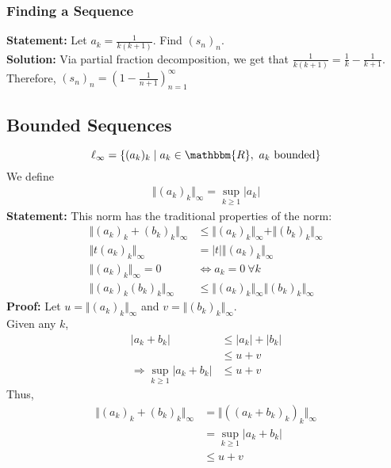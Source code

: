 \documentclass[10pt]{extarticle}
\newcommand{\R}{\mathbbm{R}}
\begin{document}
        \subsubsection{Finding a Sequence}%
        \textbf{Statement:} Let $a_k = \frac{1}{k(k+1)}$. Find $(s_n)_n$.\\

        \textbf{Solution:} Via partial fraction decomposition, we get that $\frac{1}{k(k+1)} = \frac{1}{k}-\frac{1}{k+1}$. Therefore, $(s_n)_n = \left(1-\frac{1}{n+1}\right)_{n=1}^{\infty}$
    \subsection{Bounded Sequences}%
    \[
      \ell_{\infty} = \left\{(a_k)_k \mid a_k\in\R,~a_k~\text{bounded}\right\}
    \] 
    We define
    \begin{align*}
      \Vert(a_k)_k\Vert_{\infty} = \sup_{k\geq 1}|a_k|\tag*{Infinity Norm}
    \end{align*}
    \textbf{Statement:} This norm has the traditional properties of the norm:
    \begin{align*}
      \Vert (a_k)_k + (b_k)_k\Vert_{\infty} &\leq \Vert(a_k)_k\Vert_{\infty} + \Vert(b_k)_k\Vert_{\infty}\tag*{Triangle Inequality}\\
      \Vert t(a_k)_k\Vert_{\infty} &= |t|\Vert(a_k)_k\Vert_{\infty}\tag*{Scalar Multiplication}\\
      \Vert(a_k)_k\Vert_{\infty} = 0 &\Leftrightarrow a_k = 0~\forall k\tag*{Zero Property}\\
      \Vert(a_k)_k(b_k)_k\Vert_{\infty} &\leq \Vert(a_k)_k\Vert_{\infty}\Vert(b_k)_k\Vert_{\infty}\tag*{Multiplication}
    \end{align*}
    \textbf{Proof:} Let $u = \Vert(a_k)_k\Vert_{\infty}$ and $v = \Vert(b_k)_k\Vert_{\infty}$.\\

      Given any $k$,
      \begin{align*}
        |a_k + b_k| &\leq |a_k| + |b_k| \tag*{Triangle Inequality on $|\cdot|$}\\
                    &\leq u+v \tag*{definition of supremum}\\
        \Rightarrow \sup_{k\geq 1}|a_k + b_k|&\leq u+v
      \end{align*}
      Thus,
      \begin{align*}
        \Vert (a_k)_k + (b_k)_k\Vert_{\infty} &= \Vert \left((a_k + b_k)_k\right)_k\Vert_{\infty}\\
                                              &= \sup_{k\geq 1}|a_k + b_k|\\
                                              &\leq u+v
      \end{align*}
\end{document}
